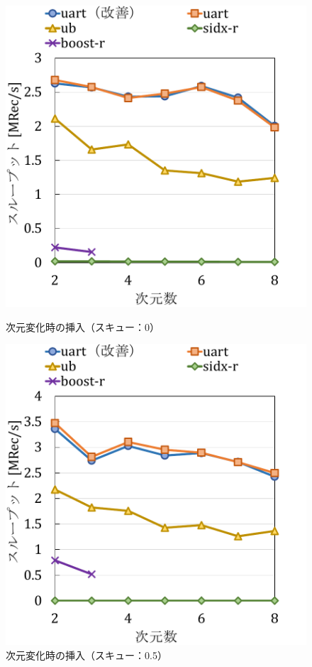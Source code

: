 \begin{figure}
  \begin{minipage}[c]{0.495\textwidth}
    \centering
    \includegraphics[scale=0.5]{./figures/graph-dimention-insert-0.pdf}
    \caption{次元変化時の挿入（スキュー：0）}
    \label{graph:}
  \end{minipage}
  \begin{minipage}[c]{0.495\textwidth}
    \centering
    \includegraphics[scale=0.5]{./figures/graph-dimention-insert-0.5.pdf}
    \caption{次元変化時の挿入（スキュー：0.5）}
    \label{graph:paired}
  \end{minipage}
\end{figure}

